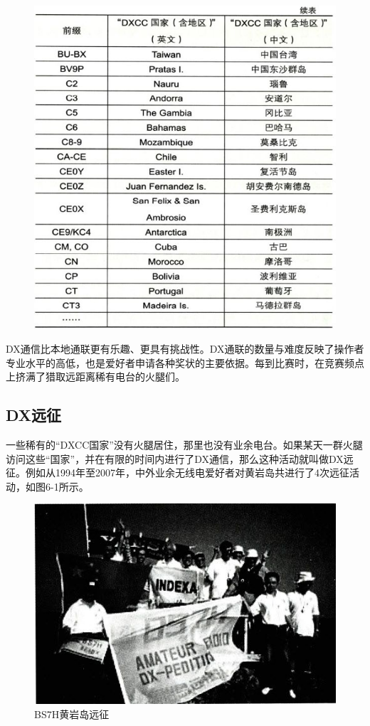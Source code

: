 \documentclass[12pt,UTF8]{ctexbook}
\begin{document}
\begin{figure}[htbp]
	\centering
	\includegraphics[width=0.7\linewidth]{70}
	\caption{}
	\label{fig:1}
\end{figure}

DX通信比本地通联更有乐趣、更具有挑战性。DX通联的数量与难度反映了操作者专业水平的高低，也是爱好者申请各种奖状的主要依据。每到比赛时，在竞赛频点上挤满了猎取远距离稀有电台的火腿们。

\subsection{DX远征}

一些稀有的“DXCC国家”没有火腿居住，那里也没有业余电台。如果某天一群火腿访问这些“国家”，并在有限的时间内进行了DX通信，那么这种活动就叫做DX远征。例如从1994年至2007年，中外业余无线电爱好者对黄岩岛共进行了4次远征活动，如图6-1所示。

\begin{figure}[htbp]
	\centering
	\includegraphics[width=0.7\linewidth]{71}
	\caption{BS7H黄岩岛远征}
	\label{fig:1}
\end{figure}
\end{document}
